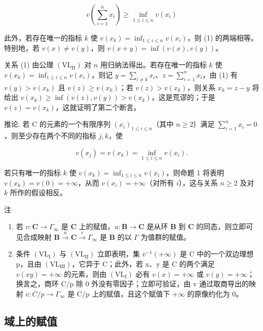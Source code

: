 \[
v \left(\sum_ {i = 1} ^ {n} x _ {i}\right) \geqslant \inf _ {1 \leqslant i \leqslant n} v (x _ {i})\tag{1}
\]

此外，若存在唯一的指标 \(k\) 使 \(v(x_k) = \inf_{1 \leqslant i \leqslant n} v(x_i)\)，则 (1) 的两端相等。特别地，若 \(v(x) \neq v(y)\)，则 \(v(x + y) = \inf(v(x), v(y))\)。

关系 (1) 由公理 \((\mathrm{VL}_{\mathrm{II}})\) 对 \(n\) 用归纳法得出。若存在唯一的指标 \(k\) 使 \(v(x_k) = \inf_{1 \leqslant i \leqslant n} v(x_i)\)，则记 \(y = \sum_{i \neq k} x_i\)、\(z = \sum_{i=1}^{n} x_i\)，由 (1) 有 \(v(y) > v(x_k)\) 且 \(v(z) \geqslant v(x_k)\)；若 \(v(z) > v(x_k)\)，则关系 \(x_k = z - y\) 将给出 \(v(x_k) \geqslant \inf(v(z), v(y)) > v(x_k)\)，这是荒谬的；于是 \(v(z) = v(x_k)\)，这就证明了第二个断言。

推论. 若 C 的元素的一个有限序列 \((x_{i})_{1\leqslant i\leqslant n}\)（其中 \(n\geqslant 2\)）满足 \(\sum_{i = 1}^{n}x_{i} = 0\)，则至少存在两个不同的指标 \(j,k\)，使

\[
v (x _ {j}) = v (x _ {k}) = \inf _ {1 \leqslant i \leqslant n} v (x _ {i}).
\]

若只有唯一的指标 \(k\) 使 \(v(x_k) = \inf_{1 \leqslant i \leqslant n} v(x_i)\)，则命题 1 将表明 \(v(x_k) = v(0) = +\infty\)，从而 \(v(x_i) = +\infty\)（对所有 \(i\)），这与关系 \(n \geqslant 2\) 及对 \(k\) 所作的假设相反。

注

\begin{enumerate}
\def\labelenumi{(\arabic{enumi})}
\item
  若 \(v: \mathbf{C} \to \Gamma_{\infty}\) 是 \(\mathbf{C}\) 上的赋值，\(u: \mathbf{B} \to \mathbf{C}\) 是从环 \(\mathbf{B}\) 到 \(\mathbf{C}\) 的同态，则立即可见合成映射 \(\mathbf{B} \xrightarrow{u} \mathbf{C} \xrightarrow{v} \Gamma_{\infty}\) 是 \(\mathbf{B}\) 的以 \(\Gamma\) 为值群的赋值。
\item
  条件 \((\mathrm{VL}_{\mathrm{I}})\) 与 \((\mathrm{VL}_{\mathrm{II}})\) 立即表明，集 \(\overline{v}^{-1}(+\infty)\) 是 C 中的一个双边理想 p，且由 \((\mathrm{VL}_{\mathrm{III}})\)，它异于 C；此外，若 x、y 是 C 的两个满足 \(v(xy)=+\infty\) 的元素，则由 \((\mathrm{VL}_{\mathrm{I}})\) 必有 \(v(x)=+\infty\) 或 \(v(y)=+\infty\)；换言之，商环 C/p 除 0 外没有零因子；立即可验证，由 v 通过取商导出的映射 \(\overline{v}:C/p\to\Gamma_{\infty}\) 是 C/p 上的赋值，且这个赋值下 \(+\infty\) 的原像约化为 0。
\end{enumerate}

\subsection{域上的赋值}

